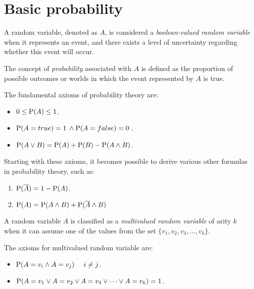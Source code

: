\section{Basic probability}

\begin{definition}
    A random variable, denoted as $A$, is considered a \emph{boolean-valued random variable} when it represents an event, and there exists a level of uncertainty regarding whether this event will occur.

    The concept of \emph{probability} associated with $A$ is defined as the proportion of possible outcomes or worlds in which the event represented by $A$ is true.    
\end{definition}
\begin{theorem}
    The fundamental axioms of probability theory are: 
    \begin{itemize}
        \item $0 \leq \textnormal{P}(A) \leq 1$. 
        \item $\textnormal{P}(A=true) = 1 \: \land \textnormal{P}(A=false) = 0\: $. 
        \item $\textnormal{P}(A \lor B)=\textnormal{P}(A)+\textnormal{P}(B)-\textnormal{P}(A \land B)$.
    \end{itemize}
\end{theorem}
Starting with these axioms, it becomes possible to derive various other formulas in probability theory, such as:
\begin{enumerate}
    \item $\textnormal{P}(\overline{A})=1-\textnormal{P}(A)$.
    \item $\textnormal{P}(A)=\textnormal{P}(A \land B)+\textnormal{P}(\overline{A} \land B)$
\end{enumerate}
\begin{definition}
    A random variable $A$ is classified as a \emph{multivalued random variable} of arity $k$ when it can assume one of the values from the set $\{v_1, v_2, v_3, \dots, v_k\}$. 
\end{definition}
\begin{theorem}
    The axioms for multivalued random variable are: 
    \begin{itemize}
        \item $\textnormal{P}(A=v_i \land A=v_j) \:\:\:\:\:\: i \neq j$. 
        \item $\textnormal{P}(A=v_1 \lor A=v_2 \lor A=v_3 \lor \dots \lor A=v_k)=1$. 
    \end{itemize}
\end{theorem}
